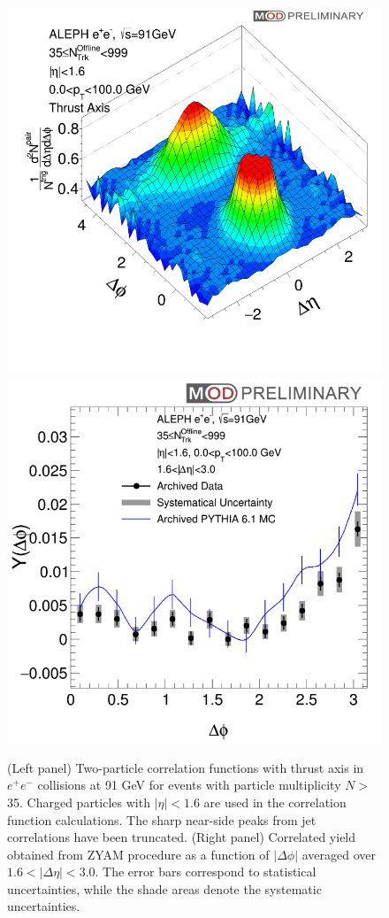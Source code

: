 \documentclass[aps,prl,twocolumn,showpacs,superscriptaddress,groupedaddress]{revtex4}  %
\begin{document}
\begin{figure}[!htb]
\begin{center}
\includegraphics[width=.29\textwidth]{plots/thrustBarrel/thrustAxisBarrelAnalysis.png}
\includegraphics[width=.29\textwidth]{plots/thrustBarrel/thrustAxisBarrelAnalysisProjection.png}
\caption{(Left panel) Two-particle correlation functions with thrust axis in $e^{+}e^{-}$ collisions at 91 GeV for events with particle multiplicity $N>$ 35. Charged particles with $|\eta|<1.6$ are used in the correlation function calculations. The sharp near-side peaks from jet correlations have been truncated. (Right panel) Correlated yield obtained from ZYAM procedure as a function of $|\Delta\phi|$ averaged over $1.6<|\Delta\eta|<3.0$. The error bars correspond to statistical uncertainties, while the shade areas denote the systematic uncertainties.}
\label{fig:figure3} 
\end{center}
\end{figure}




\end{document}
